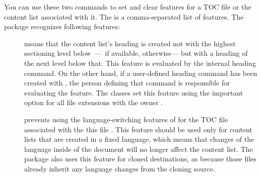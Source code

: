 \begin{Declaration}
\end{Declaration}
You can use these two commands to set and clear features for a TOC file
 or the content list associated with it. The  is a comma-separated list of features. The  package
recognizes following features:
\begin{description}
\item[] means that the content list's heading is created not
  with the highest sectioning level below
  \,---\, if available,
   otherwise\,---\,but with a heading of the next
  level below that. This feature is evaluated by the internal heading command.
  On the other hand, if a user-defined heading command has been created with
  , the person defining that command is
  responsible for evaluating the feature. The \KOMAScript{} classes set this
  feature using the %
  important{}%
   option for all file extensions
  with the owner .
\item[] prevents using the language-switching features of
   for the TOC file associated with the
  this file . This feature should be used only for content
  lists that are created in a fixed language, which means that changes of the
  language inside of the document will no longer affect the content list. The
  package also uses this feature for cloned destinations, as because those
  files already inherit any language changes from the cloning source.


\end{description}

